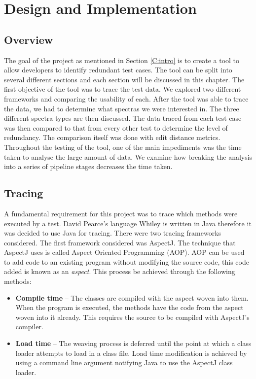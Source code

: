 \chapter{Design and Implementation}\label{C:workdone}

\section{Overview}

The goal of the project as mentioned in Section \ref{C:intro} is to create a tool to allow developers to identify redundant test cases. The tool can be split into several different sections and each section will be discussed in this chapter. The first objective of the tool was to trace the test data. We explored two different frameworks and comparing the usability of each. After the tool was able to trace the data, we had to determine what spectras we were interested in. The three different spectra types are then discussed. The data traced from each test case was then compared to that from every other test to determine the level of redundancy. The comparison itself was done with edit distance metrics. Throughout the testing of the tool, one of the main impediments was the time taken to analyse the large amount of data. We examine how breaking the analysis into a series of pipeline stages decreases the time taken.

\section{Tracing}
\label{S:trace}
A fundamental requirement for this project was to trace which methods were executed by a test. David Pearce's language Whiley is written in Java therefore it was decided to use Java for tracing. There were two tracing frameworks considered. The first framework considered was AspectJ. The technique that AspectJ uses is called Aspect Oriented Programming (AOP). AOP can be used to add code to an existing program without modifying the source code, this code added is known as an \textit{aspect}. This process be achieved through the following methods:

\begin{itemize}
\item \textbf{Compile time} --
The classes are compiled with the aspect woven into them. When the program is executed, the methods have the code from the aspect woven into it already. This requires the source to be compiled with AspectJ's compiler.
\item \textbf{Load time} --
The weaving process is deferred until the point at which a class loader attempts to load in a class file. Load time modification is achieved by using a command line argument notifying Java to use the AspectJ class loader.
\end{itemize}

